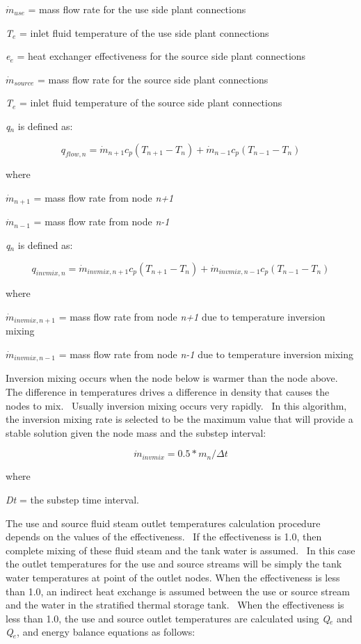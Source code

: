\({\dot m_{use}}\) = mass flow rate for the use side plant connections

\emph{T\(_{e}\)} = inlet fluid temperature of the use side plant connections

\emph{e\(_{e}\)} = heat exchanger effectiveness for the source side plant connections

\({\dot m_{source}}\) = mass flow rate for the source side plant connections

\emph{T\(_{e}\)} = inlet fluid temperature of the source side plant connections

\emph{q\(_{n}\)} is defined as:

\begin{equation}
{q_{flow,n}} = {\dot m_{n + 1}}{c_p}({T_{n + 1}} - {T_n}) + {\dot m_{n - 1}}{c_p}({T_{n - 1}} - {T_n})
\end{equation}

where

\({\dot m_{n + 1}}\) = mass flow rate from node \emph{n+1}

\({\dot m_{n - 1}}\) = mass flow rate from node \emph{n-1}

\emph{q\(_{n}\)} is defined as:

\begin{equation}
{q_{invmix,n}} = {\dot m_{invmix,n + 1}}{c_p}({T_{n + 1}} - {T_n}) + {\dot m_{invmix,n - 1}}{c_p}({T_{n - 1}} - {T_n})
\end{equation}

where

\({\dot m_{invmix,n + 1}}\) = mass flow rate from node \emph{n+1} due to temperature inversion mixing

\({\dot m_{invmix,n - 1}}\) = mass flow rate from node \emph{n-1} due to temperature inversion mixing

Inversion mixing occurs when the node below is warmer than the node above.~ The difference in temperatures drives a difference in density that causes the nodes to mix.~ Usually inversion mixing occurs very rapidly.~ In this algorithm, the inversion mixing rate is selected to be the maximum value that will provide a stable solution given the node mass and the substep interval:

\begin{equation}
{\dot m_{invmix}} = 0.5*{m_n}/\Delta t
\end{equation}

where

\emph{Dt} = the substep time interval.

The use and source fluid steam outlet temperatures calculation procedure depends on the values of the effectiveness.~ If the effectiveness is 1.0, then complete mixing of these fluid steam and the tank water is assumed.~ In this case the outlet temperatures for the use and source streams will be simply the tank water temperatures at point of the outlet nodes. When the effectiveness is less than 1.0, an indirect heat exchange is assumed between the use or source stream and the water in the stratified thermal storage tank.~ When the effectiveness is less than 1.0, the use and source outlet temperatures are calculated using \emph{Q\(_{e}\)} and \emph{Q\(_{e}\)}, and energy balance equations as follows:

